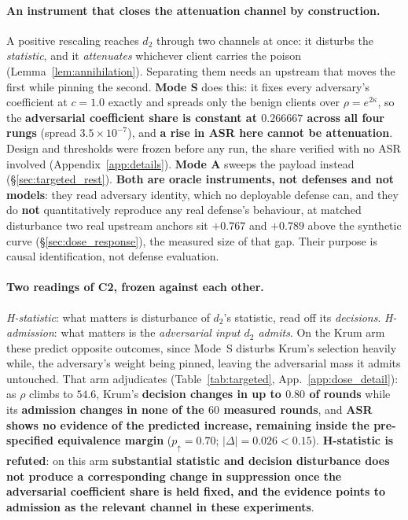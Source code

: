 \documentclass{article}
\begin{document}
\paragraph{An instrument that closes the attenuation channel by construction.} A positive rescaling reaches $d_2$ through two channels at once: it disturbs the \emph{statistic}, and it \emph{attenuates} whichever client carries the poison (Lemma~\ref{lem:annihilation}). Separating them needs an upstream that moves the first while pinning the second. \textbf{Mode S} does this: it fixes every adversary's coefficient at $c{=}1.0$ exactly and spreads only the benign clients over $\rho = e^{2\kappa}$, so the \textbf{adversarial coefficient share is constant at $0.266667$ across all four rungs} (spread $3.5{\times}10^{-7}$), and \textbf{a rise in ASR here cannot be attenuation}. Design and thresholds were frozen before any run, the share verified with no ASR involved (Appendix~\ref{app:details}). \textbf{Mode A} sweeps the payload instead (\S\ref{sec:targeted_rest}). \textbf{Both are oracle instruments, not defenses and not models}: they read adversary identity, which no deployable defense can, and they do \textbf{not} quantitatively reproduce any real defense's behaviour, at matched disturbance two real upstream anchors sit $+0.767$ and $+0.789$ above the synthetic curve (\S\ref{sec:dose_response}), the measured size of that gap. Their purpose is causal identification, not defense evaluation.

\paragraph{Two readings of C2, frozen against each other.} \emph{H-statistic}: what matters is disturbance of $d_2$'s statistic, read off its \emph{decisions}. \emph{H-admission}: what matters is the \emph{adversarial input $d_2$ admits}. On the Krum arm these predict opposite outcomes, since Mode~S disturbs Krum's selection heavily while, the adversary's weight being pinned, leaving the adversarial mass it admits untouched. That arm adjudicates (Table~\ref{tab:targeted}, App.~\ref{app:dose_detail}): as $\rho$ climbs to $54.6$, Krum's \textbf{decision changes in up to $0.80$ of rounds} while its \textbf{admission changes in none of the $60$ measured rounds}, and \textbf{ASR shows no evidence of the predicted increase, remaining inside the pre-specified equivalence margin} ($p_{\uparrow}{=}0.70$; $|\Delta|{=}0.026 < 0.15$). \textbf{H-statistic is refuted}: on this arm \textbf{substantial statistic and decision disturbance does not produce a corresponding change in suppression once the adversarial coefficient share is held fixed, and the evidence points to admission as the relevant channel in these experiments}.
\end{document}
